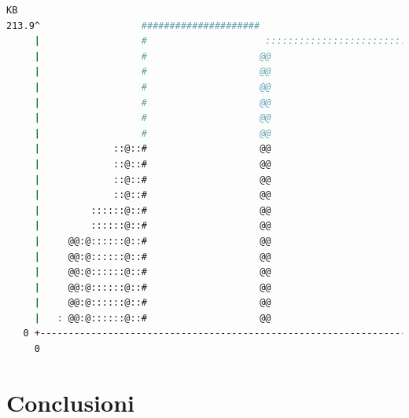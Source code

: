 \documentclass{article}
\begin{document}
\begin{lstlisting}[language=bash]
    KB
213.9^                  #####################                                 
     |                  #                     ::::::::::::::::::::::::::::::::
     |                  #                    @@                              :
     |                  #                    @@                              :
     |                  #                    @@                              :
     |                  #                    @@                              :
     |                  #                    @@                              :
     |                  #                    @@                              :
     |             ::@::#                    @@                              :
     |             ::@::#                    @@                              :
     |             ::@::#                    @@                              :
     |             ::@::#                    @@                              :
     |         ::::::@::#                    @@                              :
     |         ::::::@::#                    @@                              :
     |     @@:@::::::@::#                    @@                              :
     |     @@:@::::::@::#                    @@                              :
     |     @@:@::::::@::#                    @@                              :
     |     @@:@::::::@::#                    @@                              :
     |     @@:@::::::@::#                    @@                              :
     |   : @@:@::::::@::#                    @@                              :
   0 +----------------------------------------------------------------------->Mi
     0                                                                   5.393
\end{lstlisting}


\newpage
\section{Conclusioni}
\end{document}
